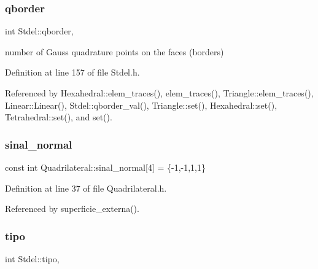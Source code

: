 \mbox{\label{classStdel_a63a106b928d211c71d5fec6449ef4d51}} 
\subsubsection{\texorpdfstring{qborder}{qborder}}
{\footnotesize\ttfamily int Stdel\+::qborder\hspace{0.3cm}{\ttfamily [protected]}, {\ttfamily [inherited]}}



number of Gauss quadrature points on the faces (borders) 



Definition at line 157 of file Stdel.\+h.



Referenced by Hexahedral\+::elem\+\_\+traces(), elem\+\_\+traces(), Triangle\+::elem\+\_\+traces(), Linear\+::\+Linear(), Stdel\+::qborder\+\_\+val(), Triangle\+::set(), Hexahedral\+::set(), Tetrahedral\+::set(), and set().

\mbox{\label{classQuadrilateral_a3d58a84a8ac0c9172e81ac99db38befa}} 
\subsubsection{\texorpdfstring{sinal\+\_\+normal}{sinal\_normal}}
{\footnotesize\ttfamily const int Quadrilateral\+::sinal\+\_\+normal\mbox{[}4\mbox{]} = \{-\/1,-\/1,1,1\}\hspace{0.3cm}{\ttfamily [private]}}



Definition at line 37 of file Quadrilateral.\+h.



Referenced by superficie\+\_\+externa().

\mbox{\label{classStdel_a68f8781a42728758ccde39e15cd319ed}} 
\subsubsection{\texorpdfstring{tipo}{tipo}}
{\footnotesize\ttfamily int Stdel\+::tipo\hspace{0.3cm}{\ttfamily [protected]}, {\ttfamily [inherited]}}




